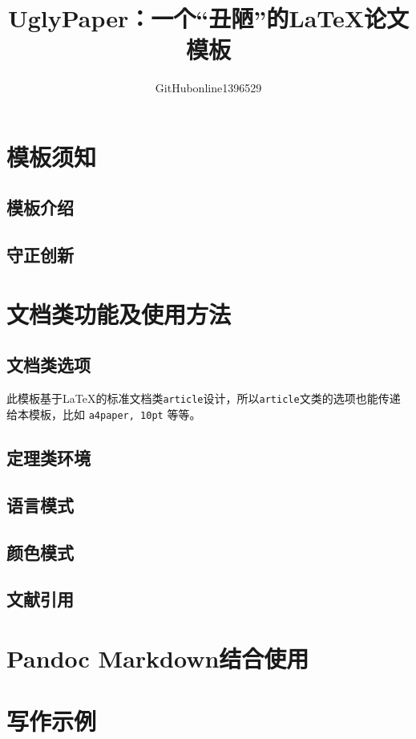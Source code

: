 \documentclass[10pt, twocolumn, compact, crimson]{uglypaper}
\title{\bfseries UglyPaper：一个“丑陋”的\LaTeX{}论文模板}
\author{GitHubonline1396529}
\date{\zhdate{2022/12/31}}
\begin{document}

\section{模板须知}
\subsection{模板介绍}


\subsection{守正创新}


\section{文档类功能及使用方法}
\subsection{文档类选项}\label{ssec:classoptions}

此模板基于\LaTeX{}的标准文档类\texttt{article}设计，所以\texttt{article}文类的选项也能传递给本模板，比如 \texttt{a4paper, 10pt} 等等。



\subsection{定理类环境}


\subsection{语言模式}


\subsection{颜色模式}\label{ssec:colors}


\subsection{文献引用}


\section{Pandoc Markdown结合使用}


\section{写作示例}



\printbibliography[
  title=\ebibname]

\appendix
\addappheadtotoc
\end{document}
